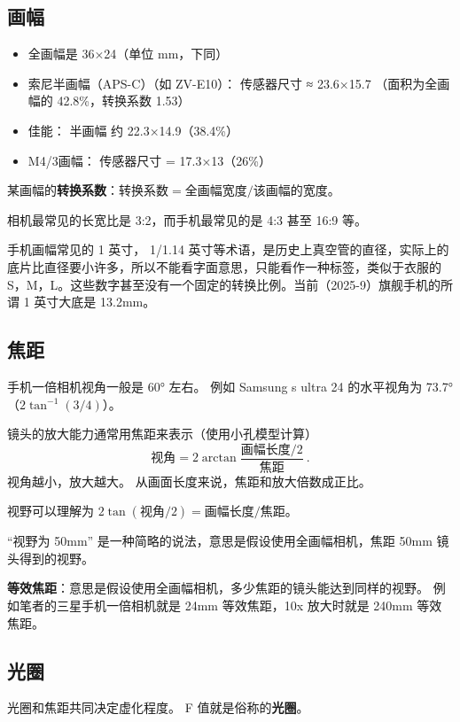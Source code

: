 
\subsection{画幅}
\begin{itemize}
\item 全画幅是 36×24（单位 mm，下同）
\item 索尼半画幅（APS-C）（如 ZV-E10）： 传感器尺寸 ≈ 23.6×15.7 （面积为全画幅的 42.8\%，转换系数 1.53）
\item 佳能： 半画幅 约 22.3×14.9（38.4\%）
\item M4/3画幅： 传感器尺寸 = 17.3×13（26\%）
\end{itemize}

某画幅的\textbf{转换系数}：$\text{转换系数} = \text{全画幅宽度}/\text{该画幅的宽度}$。

相机最常见的长宽比是 3:2，而手机最常见的是 4:3 甚至 16:9 等。

手机画幅常见的 1 英寸， 1/1.14 英寸等术语，是历史上真空管的直径，实际上的底片比直径要小许多，所以不能看字面意思，只能看作一种标签，类似于衣服的 S，M，L。这些数字甚至没有一个固定的转换比例。当前（2025-9）旗舰手机的所谓 1 英寸大底是 13.2mm。

\subsection{焦距}
手机一倍相机视角一般是 60° 左右。 例如 Samsung s ultra 24 的水平视角为 73.7°（$2\tan^{-1}(3/4)$）。

镜头的放大能力通常用焦距来表示（使用小孔模型计算）
\begin{equation}
\text{视角} = 2\arctan{\frac{\text{画幅长度/2}}{\text{焦距}}}~.
\end{equation}
视角越小，放大越大。 从画面长度来说，焦距和放大倍数成正比。

视野可以理解为 $2\tan(\text{视角}/2) = \text{画幅长度}/{\text{焦距}}$。

“视野为 50mm” 是一种简略的说法，意思是假设使用全画幅相机，焦距 50mm 镜头得到的视野。

\textbf{等效焦距}：意思是假设使用全画幅相机，多少焦距的镜头能达到同样的视野。 例如笔者的三星手机一倍相机就是 24mm 等效焦距，10x 放大时就是 240mm 等效焦距。


\subsection{光圈}
光圈和焦距共同决定虚化程度。 F 值就是俗称的\textbf{光圈}。

